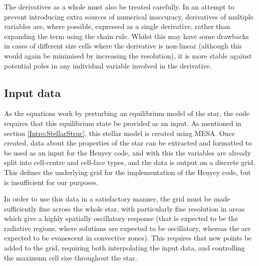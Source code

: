\documentclass[11pt]{amsart}
\begin{document}
The derivatives as a whole must also be treated carefully.  In an attempt to prevent introducing extra sources of numerical inaccuracy, derivatives of multiple variables are, where possible, expressed as a single derivative, rather than expanding the term using the chain rule.  Whilst this may have some drawbacks in cases of different size cells where the derivative is non-linear (although this would again be minimised by increasing the resolution), it is more stable against potential poles in any individual variable involved in the derivative.



\subsection{Input data}   \label{Implement:Input}

As the equations work by perturbing an equilibrium model of the star, the code requires that this equilibrium state be provided as an input.  As mentioned in section \ref{Intro:StellarStruc}, this stellar model is created using MESA.  Once created, data about the properties of the star can be extracted and formatted to be used as an input for the Henyey code, and with this the variables are already split into cell-centre and cell-face types, and the data is output on a discrete grid.  This defines the underlying grid for the implementation of the Henyey code, but is insufficient for our purposes.

In order to use this data in a satisfactory manner, the grid must be made sufficiently fine across the whole star, with particularly fine resolution in areas which give a highly spatially oscillatory response (that is expected to be the radiative regions, where solutions are expected to be oscillatory, whereas the are expected to be evanescent in convective zones).  This requires that new points be added to the grid, requiring both interpolating the input data, and controlling the maximum cell size throughout the star.
\end{document}
